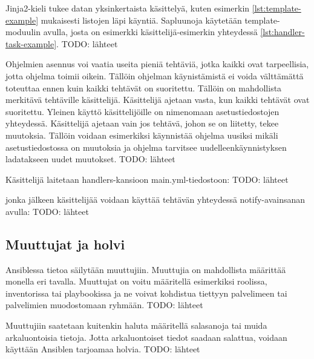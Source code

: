 Jinja2-kieli tukee datan yksinkertaista käsittelyä, kuten esimerkin
\ref{lst:template-example} mukaisesti listojen läpi käyntiä. Sapluunoja
käytetään template-moduulin avulla, josta on esimerkki käsittelijä-esimerkin
yhteydessä \ref{lst:handler-task-example}.
TODO: lähteet

Ohjelmien asennus voi vaatia useita pieniä tehtäviä, jotka kaikki ovat
tarpeellisia, jotta ohjelma toimii oikein. Tällöin ohjelman käynistämistä ei
voida välttämättä toteuttaa ennen kuin kaikki tehtävät on suoritettu.
Tällöin on mahdollista merkitävä tehtäville käsittelijä. Käsittelijä ajetaan
vasta, kun kaikki tehtävät ovat suoritettu. Yleinen käyttö käsittelijöille
on nimenomaan asetustiedostojen yhteydessä. Käsittelijä ajetaan vain jos
tehtävä, johon se on liitetty, tekee muutoksia. Tällöin voidaan esimerkiksi
käynnistää ohjelma uusiksi mikäli asetustiedostossa on muutoksia ja ohjelma
tarvitsee uudelleenkäynnistyksen ladatakseen uudet muutokset.
TODO: lähteet

Käsittelijä laitetaan handlers-kansioon main.yml-tiedostoon:
TODO: lähteet



jonka jälkeen käsittelijää voidaan käyttää tehtävän yhteydessä notify-avainsanan
avulla:
TODO: lähteet



\subsection{Muuttujat ja holvi}

Ansiblessa tietoa säilytään muuttujiin. Muuttujia on mahdollista määrittää monella
eri tavalla. Muuttujat on voitu määritellä esimerkiksi roolissa, inventorissa
tai playbookissa ja ne voivat kohdistua tiettyyn palvelimeen tai palvelimien
muodostomaan ryhmään.
TODO: lähteet

Muuttujiin saatetaan kuitenkin haluta määritellä salasanoja tai muida arkaluontoisia
tietoja. Jotta arkaluontoiset tiedot saadaan salattua, voidaan käyttään Ansiblen
tarjoamaa holvia.
TODO: lähteet

